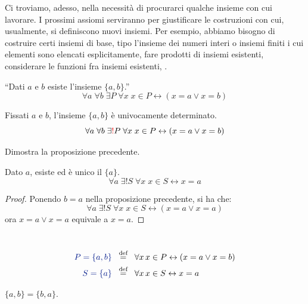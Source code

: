Ci troviamo, adesso, nella necessit\`a di procurarci qualche insieme con cui lavorare. I prossimi assiomi serviranno per giustificare le costruzioni con cui,
usualmente, si definiscono nuovi insiemi. Per esempio, abbiamo bisogno di costruire certi insiemi di base, tipo l'insieme dei numeri interi o insiemi finiti i cui elementi sono elencati esplicitamente, fare prodotti di insiemi esistenti, 
considerare le funzioni fra insiemi esistenti, \etc.

\begin{axiom}
\label{ax4}
``Dati $a$ e $b$ esiste l'insieme $\{a,b\}$.''
\[ \forall a \; \forall b \; \exists P \; \forall x \; x \in P \leftrightarrow (x = a \lor x = b)
	\]
\end{axiom}

\begin{proposition}
Fissati $a$ e $b$, l'insieme $\{a,b\}$ \`e univocamente determinato.
\[\forall a \; \forall b \; \exists\textcolor{red}{!} P \; \forall x \; x \in P \leftrightarrow (x = a \lor x = b)
	\]
\end{proposition}

\begin{exercise}
	Dimostra la proposizione precedente.
\end{exercise}

\begin{proposition}
	Dato $a$, esiste ed \`e unico il  $\{a\}$.
	\[ \forall a \; \exists ! S \; \forall x \; x \in S \leftrightarrow x = a
		\]
\end{proposition}

\begin{proof}
	Ponendo $b = a$ nella proposizione precedente, si ha che:
	\[ \forall a \; \exists ! S \; \forall x \; x \in S \leftrightarrow (x = a \lor x= a)
		\]
	ora $x = a \lor x = a$ equivale a $x = a$.
\end{proof}

\begin{notation}
\ \\
\baselineskip
\begin{align*}
{\drkblu P = \{a,b\}} &\;\;\Mydef\;\; \forall x \, x \in P \leftrightarrow (x = a
\lor x = b)\\
{\drkblu S = \{a\}} &\;\;\Mydef\;\; \forall x \, x \in S \leftrightarrow x = a
\end{align*}
\end{notation}

\begin{remark}
	$\{a,b\} = \{b,a\}$.
\end{remark}

